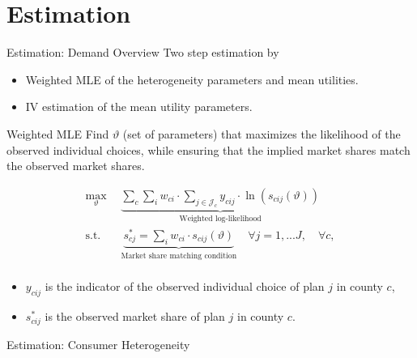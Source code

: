 \documentclass[professionalfonts, aspectratio=169]{beamer}
\begin{document}
\section{Estimation}

\begin{frame}{Estimation: Demand Overview}
  Two step estimation by \citet{goolsbeeConsumerGainsDirect2004}

  \begin{itemize}
    \item Weighted MLE of the heterogeneity parameters and mean utilities.
    \item IV estimation of the mean utility parameters.
  \end{itemize}
\end{frame}

\begin{frame}{Weighted MLE}
  Find $\vartheta$ (set of parameters) that maximizes the likelihood of the observed individual choices, while ensuring that the implied market shares match the observed market shares.

  \begin{equation}
    \begin{aligned}
        \max_\vartheta
                            & \underbrace{\sum_{c} \sum_i w_{ci} \cdot \sum_{j\in \mathcal{J}_c}
            y_{cij} \cdot \ln(s_{cij} (\vartheta ))}
        _{\text{Weighted log-likelihood}}                                                        \\
        \textrm{s.t.} \quad & \underbrace{{s_{cj}^*} =
            \sum_i w_{ci} \cdot s_{cij} (\vartheta )}_{\text{Market share matching condition}}
        \quad \forall j = 1, ...J, \quad \forall c,                                              \\
    \end{aligned}
\end{equation}
\begin{itemize}\small
  \item $y_{cij}$ is the indicator of the observed individual choice of plan $j$ in county $c$,
  \item $s_{cij}^*$ is the observed market share of plan $j$ in county $c$.
\end{itemize}
  
\end{frame}

\begin{frame}{Estimation: Consumer Heterogeneity}
  
\end{frame}
\end{document}
